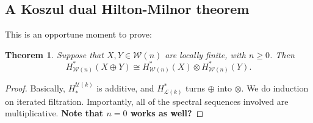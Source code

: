 \documentclass[11pt]{amsart}
\theoremstyle{plain}
\newtheorem{thm}{Theorem}[section]
\theoremstyle{definition}
\newcommand{\calW}{\mathcal{W}}
\newcommand{\calU}{\mathcal{U}}
\newcommand{\calL}{\mathcal{L}}
\theoremstyle{plain}
\begin{document}
\begin{Calculations of HWn for n nonzero}
\subsection{A Koszul dual Hilton-Milnor theorem}
This is an opportune moment to prove:
\begin{thm}\label{Koszul-dual Hilton-Milnor theorem}
Suppose that $X,Y\in\calW(n)$ are locally finite, with $n\geq0$. Then 
\[H^*_{\calW(n)}(X\oplus Y)\cong H^*_{\calW(n)}(X)\otimes H^*_{\calW(n)}(Y).\]
\end{thm}
\begin{proof}
Basically, $H_{*}^{\calU(k)}$ is additive, and $H^*_{\calL(k)}$ turns $\oplus$ into $\otimes $. We do induction on iterated filtration. Importantly, all of the spectral sequences involved are multiplicative. \textbf{Note that $n=0$ works as well?}
\end{proof}


\end{Calculations of HWn for n nonzero}
\end{document}
